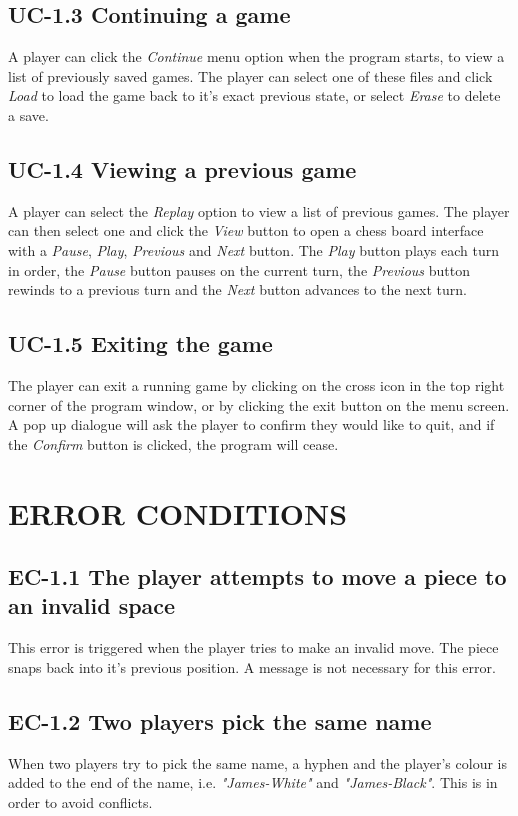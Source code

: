 \documentclass{project}
\begin{document}
\subsection{UC-1.3 Continuing a game}
A player can click the \emph{Continue} menu option when the program starts, to view a list of previously saved games. The player can select one of these files and click \emph{Load} to load the game back to it's exact previous state, or select \emph{Erase} to delete a save.
\subsection{UC-1.4 Viewing a previous game}
A player can select the \emph{Replay} option to view a list of previous games. The player can then select one and click the \emph{View} button to open a chess board interface with a \emph{Pause}, \emph{Play}, \emph{Previous} and \emph{Next} button. The \emph{Play} button plays each turn in order, the \emph{Pause} button pauses on the current turn, the \emph{Previous} button rewinds to a previous turn and the \emph{Next} button advances to the next turn.
\subsection{UC-1.5 Exiting the game}
The player can exit a running game by clicking on the cross icon in the top right corner of the program window, or by clicking the exit button on the menu screen. A pop up dialogue will ask the player to confirm they would like to quit, and if the \emph{Confirm} button is clicked, the program will cease.
\section{ERROR CONDITIONS}
\subsection{EC-1.1 The player attempts to move a piece to an invalid space}
This error is triggered when the player tries to make an invalid move. The piece snaps back into it's previous position. A message is not necessary for this error.
\subsection{EC-1.2 Two players pick the same name}
When two players try to pick the same name, a hyphen and the player's colour is added to the end of the name, i.e. \emph{"James-White"} and \emph{"James-Black"}. This is in order to avoid conflicts.
\end{document}

